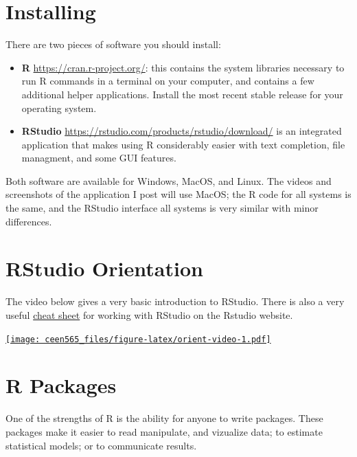 \documentclass[
]{book}
\providecommand{\tightlist}{%
  \setlength{\itemsep}{0pt}\setlength{\parskip}{0pt}}
\begin{document}
\hypertarget{installing}{%
\section{Installing}\label{installing}}

There are two pieces of software you should install:

\begin{itemize}
\tightlist
\item
  \textbf{R} \url{https://cran.r-project.org/}: this contains
  the system libraries necessary to run R commands in a terminal on your computer,
  and contains a few additional helper applications. Install the most recent
  stable release for your operating system.
\item
  \textbf{RStudio} \url{https://rstudio.com/products/rstudio/download/} is an integrated application that makes using R considerably easier
  with text completion, file managment, and some GUI features.
\end{itemize}

Both software are available for Windows, MacOS, and Linux. The videos and screenshots
of the application I post will use MacOS; the R code for all systems is the same,
and the RStudio interface all systems is very similar with minor differences.

\hypertarget{rstudio-orientation}{%
\section{RStudio Orientation}\label{rstudio-orientation}}

The video below gives a very basic introduction to RStudio.
There is also a very useful
\href{https://resources.rstudio.com/rstudio-cheatsheets/rstudio-ide-cheat-sheet}{cheat sheet}
for working with RStudio on the Rstudio website.

\href{https://www.youtube.com/embed/c3xv8wOIj-g}{\texttt{[image: ceen565\_files/figure-latex/orient-video-1.pdf]}}

\hypertarget{r-packages}{%
\section{R Packages}\label{r-packages}}

One of the strengths of R is the ability for anyone to write packages. These
packages make it easier to read manipulate, and vizualize data; to estimate
statistical models; or to communicate results.
\end{document}
